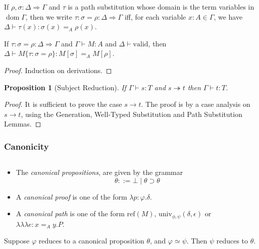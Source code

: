 \documentclass[a4paper,UKenglish]{lipics-v2016}
\newcommand*{\reff}[1]{\ensuremath{\mathrm{ref} \left( {#1} \right)}}
\newcommand*{\univ}[4]{\ensuremath{\mathrm{univ}_{{#1}, {#2}} \left({#3} , {#4} \right)}}
\newcommand*{\triplelambda}{\ensuremath{\lambda \!\! \lambda \!\! \lambda}}
\newcommand*{\vald}{\ensuremath{\vdash \mathrm{valid}}}
\newcommand*{\dom}{\ensuremath{\operatorname{dom}}}
\theoremstyle{plain}
\newtheorem{proposition}[theorem]{Proposition}
\theoremstyle{definition}
\begin{document}
\begin{definition}
If $\rho, \sigma : \Delta \Rightarrow \Gamma$ and $\tau$ is a path substitution whose domain
is the term variables in $\dom \Gamma$, then we write
$\tau : \sigma = \rho : \Delta \Rightarrow \Gamma$ iff, for each variable $x : A \in \Gamma$, we have
$\Delta \vdash \tau(x) : \sigma(x) =_A \rho(x)$.
\end{definition}

\begin{lemma}
\label{lm:pathsub}
If $\tau : \sigma = \rho : \Delta \Rightarrow \Gamma$ and $\Gamma \vdash M : A$ and $\Delta \vald$,
then $\Delta \vdash M \{ \tau : \sigma = \rho \} : M [ \sigma ] =_A M [ \rho ]$.
\end{lemma}

\begin{proof}
Induction on derivations.
\end{proof}

\begin{proposition}[Subject Reduction]
If $\Gamma \vdash s : T$ and $s \twoheadrightarrow t$ then $\Gamma \vdash t : T$.
\end{proposition}

\begin{proof}
It is sufficient to prove the case $s \rightarrow t$.  The proof is by a case analysis on $s \rightarrow t$, using the Generation,
Well-Typed Substitution and Path Substitution Lemmas.
\end{proof}

\subsubsection{Canonicity}

\begin{definition}
$ $
\begin{itemize}
\item
The \emph{canonical propositions}, are given by the grammar
$$ \theta ::= \bot \mid \theta \supset \theta $$
\item
A \emph{canonical proof} is one of the form $\lambda p : \varphi . \delta$.
\item
A \emph{canonical path} is one of the form $\reff{M}$, $\univ{\phi}{\psi}{\delta}{\epsilon}$ or $\triplelambda e : x =_A y.P$.
\end{itemize}
\end{definition}

\begin{lemma}
\label{lm:compat-beta}
Suppose $\varphi$ reduces to a canonical proposition $\theta$, and $\varphi \simeq \psi$.  Then $\psi$ reduces to $\theta$.
\end{lemma}
\end{document}
